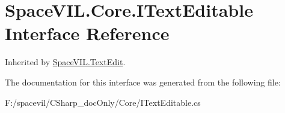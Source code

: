 \hypertarget{interface_space_v_i_l_1_1_core_1_1_i_text_editable}{}\section{Space\+V\+I\+L.\+Core.\+I\+Text\+Editable Interface Reference}
\label{interface_space_v_i_l_1_1_core_1_1_i_text_editable}


Inherited by \mbox{\hyperlink{class_space_v_i_l_1_1_text_edit}{Space\+V\+I\+L.\+Text\+Edit}}.



The documentation for this interface was generated from the following file\+:\begin{DoxyCompactItemize}
\item 
F\+:/spacevil/\+C\+Sharp\+\_\+doc\+Only/\+Core/I\+Text\+Editable.\+cs\end{DoxyCompactItemize}

